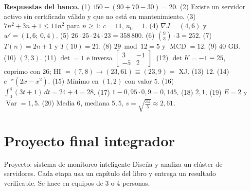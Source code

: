 \begin{tmsistemas}
\textbf{Respuestas del banco.} (1) $150-(90+70-30)=20$. (2) Existe un servidor activo sin certificado v\'alido y que no est\'a en mantenimiento. (3) $7n^2+3n+1\le11n^2$ para $n\ge1$: $c=11$, $n_0=1$. (4) $\nabla J=(4, 6)$ y $w'=(1{,}6;\ 0{,}4)$. (5) $26\cdot25\cdot24\cdot23=358\,800$. (6) $\binom93\cdot3=252$. (7) $T(n)=2n+1$ y $T(10)=21$. (8) $29\bmod12=5$ y $\operatorname{MCD}=12$. (9) $40$ GB. (10) $(2, 3)$. (11) $\det=1$ e inversa $\begin{bmatrix}3&-1\\-5&2\end{bmatrix}$. (12) $\det K=-1\equiv25$, coprimo con 26; HI $=(7, 8)\to(23, 61)\equiv(23, 9)=$ XJ. (13) $12$. (14) $e^{-x}(2x-x^2)$. (15) M\'inimo en $(1, 2)$ con valor $5$. (16) $\int_0^4(3t+1)\,dt=24+4=28$. (17) $1-0{,}95\cdot0{,}9=0{,}145$. (18) $2{,}1$. (19) $E=2$ y $\operatorname{Var}=1{,}5$. (20) Media $6$, mediana $5{,}5$, $s=\sqrt{\frac{34}{5}}\approx2{,}61$.
\end{tmsistemas}

\chapter{Proyecto final integrador}

\begin{tmdef}{Proyecto: sistema de monitoreo inteligente}
Dise\~na y analiza un cl\'uster de servidores. Cada etapa usa un cap\'itulo del libro y entrega un resultado verificable. Se hace en equipos de 3 o 4 personas.
\end{tmdef}

\begin{center}
\end{center}

